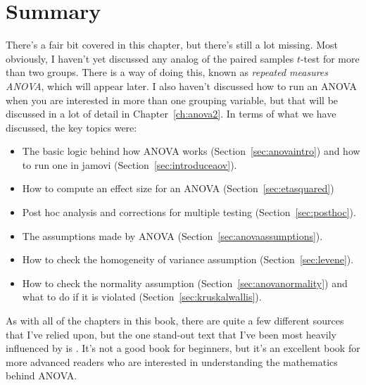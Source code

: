 \section{Summary}

There's a fair bit covered in this chapter, but there's still a lot missing. Most obviously, I haven't yet discussed any analog of the paired samples $t$-test for more than two groups. There is a way of doing this, known as {\it repeated measures ANOVA}, which will appear later. I also haven't discussed how to run an ANOVA when you are interested in more than one grouping variable, but that will be discussed in a lot of detail in Chapter~\ref{ch:anova2}. In terms of what we have discussed, the key topics were:

\begin{itemize} \itemsep -2pt
\item The basic logic behind how ANOVA works (Section~\ref{sec:anovaintro}) and how to run one in jamovi (Section~\ref{sec:introduceaov}).
\item How to compute an effect size for an ANOVA (Section~\ref{sec:etasquared})
\item Post hoc analysis and corrections for multiple testing (Section~\ref{sec:posthoc}).
\item The assumptions made by ANOVA (Section~\ref{sec:anovaassumptions}).
\item How to check the homogeneity of variance assumption (Section~\ref{sec:levene}).
\item How to check the normality assumption (Section~\ref{sec:anovanormality}) and what to do if it is violated (Section~\ref{sec:kruskalwallis}).
\end{itemize}

As with all of the chapters in this book, there are quite a few different sources that I've relied upon, but the one stand-out text that I've been most heavily influenced by is . It's not a good book for beginners, but it's an excellent book for more advanced readers who are interested in understanding the mathematics behind ANOVA. 


